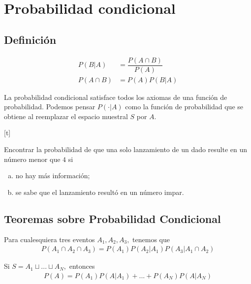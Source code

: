  \section{Probabilidad condicional}

 \subsection{Definición}

{}
\begin{defn}
 \begin{align}
  P(B|A)&=\dfrac{P(A\cap B)}{P(A)} \\
  P(A\cap B) &= P(A)P(B|A)
 \end{align}
\end{defn}


{}
\begin{rem}
 La probabilidad condicional satisface todos los axiomas de una función de probabilidad.  Podemos pensar $P(\cdot|A)$ como la función de probabilidad que se obtiene al reemplazar el espacio muestral $S$ por $A.$
\end{rem}


[t]{}
\begin{exmp}
 \label{exmp:1.13}
 Encontrar la probabilidad de que una solo lanzamiento de un dado resulte en un número menor que $4$ si
 \begin{enumerate}[(a)]
  \item no hay más información; 
  \item se sabe que el lanzamiento resultó en un número impar.
 \end{enumerate}

\end{exmp}


\subsection{Teoremas sobre Probabilidad Condicional}
{}
\begin{thm}
 \label{thm:1.9}
 Para cualesquiera tres eventos $A_{1},A_{2},A_{3},$ tenemos que
 \begin{align}
  \label{1.19}
  P(A_{1} \cap A_{2} \cap A_{3})=P(A_{1})P(A_{2}|A_{1})P(A_{3}|A_{1} \cap A_{2})
 \end{align}
\end{thm}


{}
\begin{thm}
 \label{thm:1.10} Si $S=A_{1}\sqcup ... \sqcup A_{N},$  entonces
 \begin{align}
\label{1.20}
P(A)=P(A_{1})P(A|A_{1})+...+P(A_{N})P(A|A_{N})
\end{align}
\end{thm}


